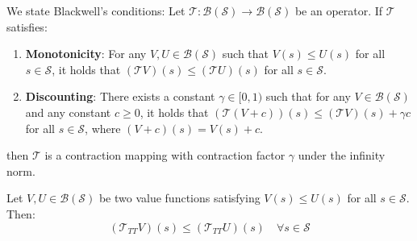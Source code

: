 \documentclass[manuscript, screen, review]{jair}
\begin{document}
We state Blackwell's conditions:
Let $\mathcal{T}: \mathcal{B}(\mathcal{S}) \to \mathcal{B}(\mathcal{S})$ be an operator. If $\mathcal{T}$ satisfies:
\begin{enumerate}
    \item \textbf{Monotonicity}: For any $V, U \in \mathcal{B}(\mathcal{S})$ such that $V(s) \le U(s)$ for all $s \in \mathcal{S}$, it holds that $(\mathcal{T} V)(s) \le (\mathcal{T} U)(s)$ for all $s \in \mathcal{S}$.
    \item \textbf{Discounting}: There exists a constant $\gamma \in [0, 1)$ such that for any $V \in \mathcal{B}(\mathcal{S})$ and any constant $c \ge 0$, it holds that $(\mathcal{T} (V + c))(s) \le (\mathcal{T} V)(s) + \gamma c$ for all $s \in \mathcal{S}$, where $(V+c)(s) = V(s) + c$.
\end{enumerate}
then $\mathcal{T}$ is a contraction mapping with contraction factor $\gamma$ under the infinity norm.

\begin{lemma}\label{lem:monotonicity_proof}
Let $V, U \in \mathcal{B}(\mathcal{S})$ be two value functions satisfying $V(s) \le U(s)$ for all $s \in \mathcal{S}$. Then:
\begin{equation}
    \left( \mathcal{T}_{TT} V \right)(s) \le \left( \mathcal{T}_{TT} U \right)(s) \quad \forall s \in \mathcal{S}
\end{equation}
\end{lemma}
\end{document}
